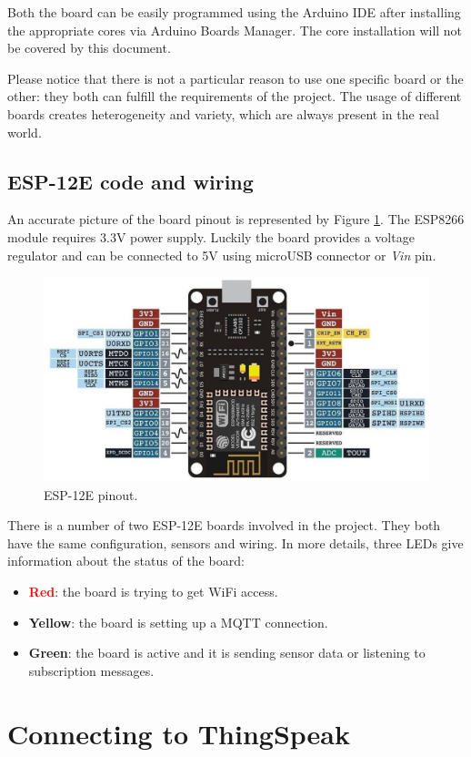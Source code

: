 Both the board can be easily programmed using the Arduino IDE after installing the appropriate cores via Arduino Boards Manager. The core installation will not be covered by this document.

Please notice that there is not a particular reason to use one specific board or the other: they both can fulfill the requirements of the project. The usage of different boards creates heterogeneity and variety, which are always present in the real world. 

\subsection{ESP-12E code and wiring}
An accurate picture of the board pinout is represented by Figure \ref{esp12_pinout}. The ESP8266 module requires 3.3V power supply. Luckily the board provides a voltage regulator and can be connected to 5V using microUSB connector or \textit{Vin} pin.

\begin{figure}[H]
	\begin{center}
		\includegraphics[width=\textwidth]{./pictures/ESP-12E_pinout.JPG}
		\caption{ESP-12E pinout.}
		\label{esp12_pinout}
	\end{center}
\end{figure}

\noindent
There is a number of two ESP-12E boards involved in the project. They both have the same configuration, sensors and wiring. In more details, three LEDs give information about the status of the board:

\begin{itemize}
	\item \textbf{\textcolor{red}{Red}}: the board is trying to get WiFi access.
	\item \textbf{\textcolor[rgb]{1,0.8,0}{Yellow}}: the board is setting up a MQTT connection.
	\item \textbf{\textcolor[rgb]{0,0.6,0}{Green}}: the board is active and it is sending sensor data or listening to subscription messages.
\end{itemize}


\section{Connecting to ThingSpeak}
